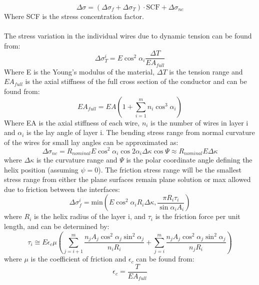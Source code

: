 \begin{equation}
    \Delta \sigma = (\Delta \sigma_f + \Delta \sigma_{T})\cdot \text{SCF} + \Delta \sigma_{nc}
    \label{eq:stressvariationred}
\end{equation}Where SCF is the stress concentration factor. \\\\The stress variation in the individual wires due to dynamic tension can be found from:
\begin{equation}
    \Delta \sigma_T^i = E \cos^2 \alpha_i \frac{\Delta T}{E A_{full}} 
    \label{eq:sigmaT}
\end{equation}
\noindent Where E is the Young's modulus of the material, $\Delta T$ is the tension range and $EA_{full}$  is the axial stiffness of the full cross section of the conductor and can be found from:
\begin{equation}
    EA_{full}=EA \left( 1+\sum_{i=1}^m n_i \cos^3\alpha_i \right)
\end{equation}
\noindent Where EA is the axial stiffness of each wire, $n_i$ is the number of wires in layer i and $\alpha_i$ is the lay angle of layer i. \newline
\newline
The bending stress range from normal curvature of the wires for small lay angles can be approximated as:
\begin{equation}
    \Delta \sigma_{nc} = R_{nominal} E \cos^2 \alpha_i \cos2 \alpha_i \Delta \kappa \cos \Psi \approx R_{nominal}E \Delta \kappa
\end{equation}
where $\Delta \kappa$ is the curvature range and $\Psi$ is the polar coordinate angle defining the helix position (assuming $\psi=0$). \newline
\newline
The friction stress range will be the smallest stress range from either the plane surfaces remain plane solution or max allowed due to friction between the interfaces:
\begin{equation}
    \Delta \sigma_f^i =\text{min}\left(E \cos^2 \alpha_i R_i \Delta \kappa , \frac{\pi R_i \tau_i}{\sin \alpha_i A_i}\right)
\end{equation}
where $R_i$ is the helix radius of the layer i, and $\tau_i$ is the friction force per unit length, and can be determined by:
\begin{equation}
    \tau_i \cong E \epsilon_c \mu \left( \sum_{j=i+1}^m \frac{n_j A_j \cos^2 \alpha_j \sin^2 \alpha_j }{n_i R_i} + \sum_{j=i}^m \frac{n_j A_j \cos^2 \alpha_j  \sin^2 \alpha_j}{n_j R_i}\right)
\end{equation}
where $\mu$ is the coefficient of friction and $\epsilon_c$ can be found from:
\begin{equation}
    \epsilon_c =\frac{T}{EA_{full}}
    \label{eq:stressvariation2}
\end{equation}